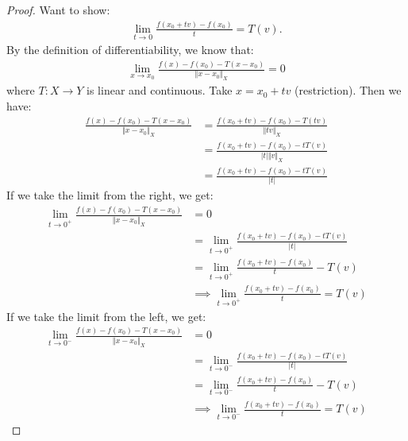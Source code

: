 \documentclass{report}
\begin{document}
\begin{proof}
    Want to show:
    \begin{align*}
        \lim_{t \to 0} \frac{f(x_0 + tv) - f(x_0)}{t} = T(v).
    \end{align*}
    By the definition of differentiability, we know that:
    \begin{align*}
        \lim_{x \to x_0} \frac{f(x) - f(x_0) - T(x-x_0)}{\Vert x - x_0 \Vert_X} = 0
    \end{align*}
    where $T: X \to Y$ is linear and continuous. Take $x = x_0 + tv$ (restriction). Then we have:
    \begin{align*}
        \frac{f(x) - f(x_0) - T(x-x_0)}{\Vert x - x_0 \Vert_X} &= \frac{f(x_0 + tv) - f(x_0) - T(tv)}{\Vert tv \Vert_X} \\
        &= \frac{f(x_0 + tv) - f(x_0) - tT(v)}{|t| \Vert v \Vert_X} \\
        &= \frac{f(x_0 + tv) - f(x_0) - tT(v)}{|t|}
    \end{align*}
    If we take the limit from the right, we get:
    \begin{align*}
        \lim_{t \to 0^+} \frac{f(x) - f(x_0) - T(x-x_0)}{\Vert x - x_0 \Vert_X} &= 0 \\
        &= \lim_{t \to 0^+} \frac{f(x_0 + tv) - f(x_0) - tT(v)}{|t|} \\
        &= \lim_{t \to 0^+} \frac{f(x_0 + tv) - f(x_0)}{t} - T(v) \\
        &\implies \lim_{t \to 0^+} \frac{f(x_0 + tv) - f(x_0)}{t} = T(v)
    \end{align*}
    If we take the limit from the left, we get:
    \begin{align*}
        \lim_{t \to 0^-} \frac{f(x) - f(x_0) - T(x-x_0)}{\Vert x - x_0 \Vert_X} &= 0 \\
        &= \lim_{t \to 0^-} \frac{f(x_0 + tv) - f(x_0) - tT(v)}{|t|} \\
        &= \lim_{t \to 0^-} \frac{f(x_0 + tv) - f(x_0)}{t} - T(v) \\
        &\implies \lim_{t \to 0^-} \frac{f(x_0 + tv) - f(x_0)}{t} = T(v)
    \end{align*}
\end{proof}
\end{document}
